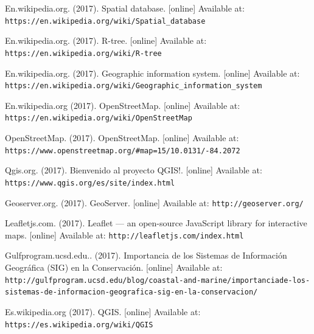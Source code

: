 \documentclass{article}
\begin{document}
\newpage

\begin{thebibliography}{99}
  En.wikipedia.org. (2017). Spatial database. [online] Available at: \texttt{https://en.wikipedia.org/wiki/Spatial\_database}

 En.wikipedia.org. (2017). R-tree. [online] Available at: \texttt{https://en.wikipedia.org/wiki/R-tree}

 En.wikipedia.org. (2017). Geographic information system. [online] Available at: \texttt{https://en.wikipedia.org/wiki/Geographic\_information\_system}

  En.wikipedia.org  (2017). OpenStreetMap. [online] Available at: \texttt {https://en.wikipedia.org/wiki/OpenStreetMap}

 OpenStreetMap. (2017). OpenStreetMap. [online] Available at: \texttt{https://www.openstreetmap.org/\#map=15/10.0131/-84.2072}

 Qgis.org. (2017).  Bienvenido al proyecto QGIS!. [online] Available at: \texttt{ https://www.qgis.org/es/site/index.html}

 Geoserver.org. (2017).  GeoServer. [online] Available at: \texttt{http://geoserver.org/}

 Leafletjs.com. (2017). Leaflet — an open-source JavaScript library for interactive maps. [online] Available at: \texttt{http://leafletjs.com/index.html}

  Gulfprogram.ucsd.edu.. (2017).   Importancia de los Sistemas de Informaci\'on Geogr\'afica (SIG) en la Conservaci\'on. [online] Available at: \texttt{http://gulfprogram.ucsd.edu/blog/coastal-and-marine/importancia\-de-los-sistemas-de-informacion-geografica-sig-en-la-conservacion/}

  Es.wikipedia.org  (2017). QGIS. [online] Available at: \texttt {https://es.wikipedia.org/wiki/QGIS}

\end{thebibliography}
\end{document}
